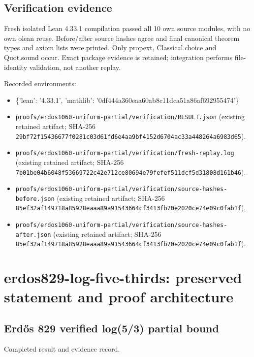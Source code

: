 \documentclass[11pt,a4paper]{article}
\begin{document}
\subsection{Verification evidence}
Fresh isolated Lean 4.33.1 compilation passed all 10 own source modules, with no own olean reuse. Before/after source hashes agree and final canonical theorem types and axiom lists were printed. Only propext, Classical.choice and Quot.sound occur. Exact package evidence is retained; integration performs file-identity validation, not another replay.

Recorded environments:

\begin{itemize}
\item \{'lean': '4.33.1', 'mathlib': '0df444a360eaa60ab8c11dca51a86af692955474'\}
\end{itemize}
\begin{itemize}
\item \texttt{proofs/erdos1060-uniform-partial/verification/RESULT.json} (existing retained artifact; SHA-256 \texttt{29bf72f15436677f0281c03d61fd6e4aa9bf4152d6704ac33a448264a6983d65}).
\end{itemize}
\begin{itemize}
\item \texttt{proofs/erdos1060-uniform-partial/verification/fresh-replay.log} (existing retained artifact; SHA-256 \texttt{7b01be04b6048f53669722c42e712ce80694e79fefef511dcf5d31808d161b46}).
\end{itemize}
\begin{itemize}
\item \texttt{proofs/erdos1060-uniform-partial/verification/source-hashes-before.json} (existing retained artifact; SHA-256 \texttt{85ef32af149718a85928eaaa89a91543664cf3413fb70e2020ce74e09c0fab1f}).
\end{itemize}
\begin{itemize}
\item \texttt{proofs/erdos1060-uniform-partial/verification/source-hashes-after.json} (existing retained artifact; SHA-256 \texttt{85ef32af149718a85928eaaa89a91543664cf3413fb70e2020ce74e09c0fab1f}).
\end{itemize}
\clearpage
\section{erdos829-log-five-thirds: preserved statement and proof architecture}
\subsection{Erdős 829 verified log(5/3) partial bound}
Completed result and evidence record.
\end{document}
